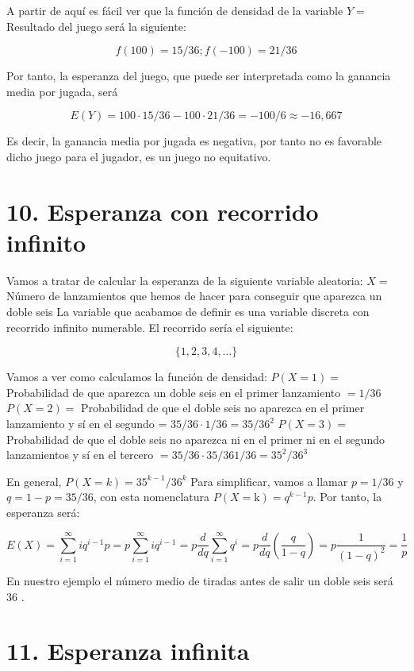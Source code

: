 \documentclass[
  a4paper,
  DIV=11,
  numbers=noendperiod]{scrreprt}
\begin{document}
A partir de aquí es fácil ver que la función de densidad de la variable
\(Y=\) Resultado del juego será la siguiente:

\[
f(100)=15 / 36 ; f(-100)=21 / 36
\]

Por tanto, la esperanza del juego, que puede ser interpretada como la
ganancia media por jugada, será

\[
E(Y)=100 \cdot 15 / 36-100 \cdot 21 / 36=-100 / 6 \approx-16,667
\]

Es decir, la ganancia media por jugada es negativa, por tanto no es
favorable dicho juego para el jugador, es un juego no equitativo.

\section{10. Esperanza con recorrido
infinito}\label{esperanza-con-recorrido-infinito}

Vamos a tratar de calcular la esperanza de la siguiente variable
aleatoria: \(X=\) Número de lanzamientos que hemos de hacer para
conseguir que aparezca un doble seis La variable que acabamos de definir
es una variable discreta con recorrido infinito numerable. El recorrido
sería el siguiente:

\[
\{1,2,3,4, \ldots\}
\]

Vamos a ver como calculamos la función de densidad: \(P(X=1)=\)
Probabilidad de que aparezca un doble seis en el primer lanzamiento
\(=1 / 36\) \(P(X=2)=\) Probabilidad de que el doble seis no aparezca en
el primer lanzamiento y sí en el segundo =
\(35 / 36 \cdot 1 / 36=35 / 36^{2}\) \(P(X=3)=\) Probabilidad de que el
doble seis no aparezca ni en el primer ni en el segundo lanzamientos y
sí en el tercero \(=35 / 36 \cdot 35 / 361 / 36=35^{2} / 36^{3}\)

En general, \(P(X=k)=35^{k-1} / 36^{k}\) Para simplificar, vamos a
llamar \(p=1 / 36\) y \(q=1-p=35 / 36\), con esta nomenclatura
\(P(X=\mathrm{k})=q^{k-1} p\). Por tanto, la esperanza será:

\[
E(X)=\sum_{i=1}^{\infty} i q^{i-1} p=p \sum_{i=1}^{\infty} i q^{i-1}=p \frac{d}{d q} \sum_{i=1}^{\infty} q^{i}=p \frac{d}{d q}\left(\frac{q}{1-q}\right)=p \frac{1}{(1-q)^{2}}=\frac{1}{p}
\]

En nuestro ejemplo el número medio de tiradas antes de salir un doble
seis será 36 .

\section{11. Esperanza infinita}\label{esperanza-infinita}
\end{document}
